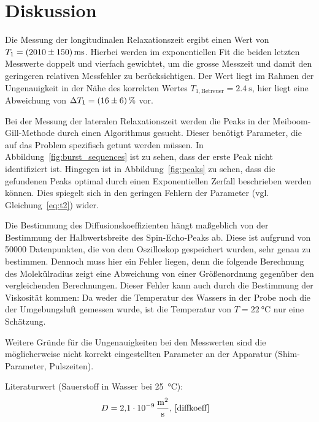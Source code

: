 \section{Diskussion}%
\label{sec:diskussion}
Die Messung der longitudinalen Relaxationszeit
ergibt einen Wert von $T_1 = \SI{2010 \pm 150}{\milli\second}$.
Hierbei werden im exponentiellen Fit die beiden letzten Messwerte doppelt und vierfach gewichtet,
um die grosse Messzeit und damit den geringeren relativen Messfehler zu berücksichtigen.
Der Wert liegt im Rahmen der Ungenauigkeit in der Nähe des korrekten Wertes
$T_{1, \text{Betreuer}} = \SI{2.4}{\second}$\cite{t1betreuer},
hier liegt eine Abweichung von $\Delta T_1 = \SI{16\pm6}{\percent}$ vor.

Bei der Messung der lateralen Relaxationszeit werden die Peaks in der Meiboom-Gill-Methode
durch einen Algorithmus gesucht.
Dieser benötigt Parameter, die auf das Problem spezifisch getunt werden müssen.
In Abbildung~\ref{fig:burst_sequences} ist zu sehen, dass der erste Peak nicht identifiziert ist.
Hingegen ist in Abbildung~\ref{fig:peaks} zu sehen, dass die gefundenen Peaks
optimal durch einen Exponentiellen Zerfall beschrieben werden können.
Dies spiegelt sich in den geringen Fehlern der Parameter (vgl. Gleichung~\eqref{eq:t2}) wider.

Die Bestimmung des Diffusionskoeffizienten hängt maßgeblich von der Bestimmung der Halbwertsbreite des
Spin-Echo-Peaks ab.
Diese ist aufgrund von \num{50000} Datenpunkten, die von dem Oszilloskop gespeichert wurden, sehr genau zu bestimmen.
Dennoch muss hier ein Fehler liegen, denn die folgende Berechnung des Molekülradius
zeigt eine Abweichung von einer Größenordnung gegenüber den vergleichenden Berechnungen.
Dieser Fehler kann auch durch die Bestimmung der Viskosität kommen:
Da weder die Temperatur des Wassers in der Probe noch die der Umgebungsluft gemessen wurde,
ist die Temperatur von $T = \SI{22}{\celsius}$ nur eine Schätzung.

Weitere Gründe für die Ungenauigkeiten bei den Messwerten sind die
möglicherweise nicht korrekt eingestellten Parameter an der Apparatur
(Shim-Parameter, Pulszeiten).


Literaturwert (Sauerstoff in Wasser bei \SI{25}{\celsius}):
\begin{align}
  D &= \SI{2.1e-9}{\meter\squared\per\second} \text{, \cite{diffkoeff}}
\end{align}
